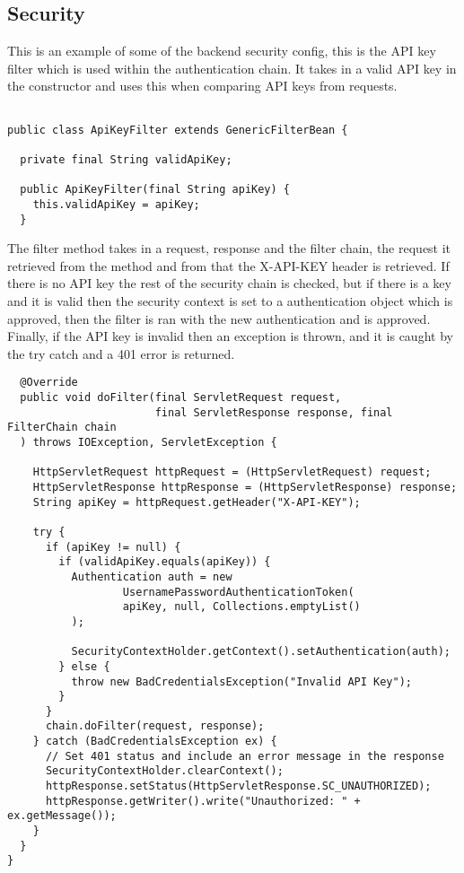 \documentclass[]{project_report}
\begin{document}
\subsection{Security}
This is an example of some of the backend security config, this is the API key filter which is used within the authentication chain. It takes in a valid API key in the constructor and uses this when comparing API keys from requests. 


\begin{verbatim}

public class ApiKeyFilter extends GenericFilterBean {

  private final String validApiKey;

  public ApiKeyFilter(final String apiKey) {
    this.validApiKey = apiKey;
  }

\end{verbatim}

The filter method takes in a request, response and the filter chain, the request it retrieved from the method and from that the X-API-KEY header is retrieved. If there is no API key the rest of the security chain is checked, but if there is a key and it is valid then the security context is set to a authentication object which is approved, then the filter is ran with the new authentication and is approved. Finally, if the API key is invalid then an exception is thrown, and it is caught by the try catch and a 401 error is returned. 

\begin{verbatim}
  @Override
  public void doFilter(final ServletRequest request,
                       final ServletResponse response, final FilterChain chain
  ) throws IOException, ServletException {

    HttpServletRequest httpRequest = (HttpServletRequest) request;
    HttpServletResponse httpResponse = (HttpServletResponse) response;
    String apiKey = httpRequest.getHeader("X-API-KEY");

    try {
      if (apiKey != null) {
        if (validApiKey.equals(apiKey)) {
          Authentication auth = new
                  UsernamePasswordAuthenticationToken(
                  apiKey, null, Collections.emptyList()
          );

          SecurityContextHolder.getContext().setAuthentication(auth);
        } else {
          throw new BadCredentialsException("Invalid API Key");
        }
      }
      chain.doFilter(request, response);
    } catch (BadCredentialsException ex) {
      // Set 401 status and include an error message in the response
      SecurityContextHolder.clearContext();
      httpResponse.setStatus(HttpServletResponse.SC_UNAUTHORIZED);
      httpResponse.getWriter().write("Unauthorized: " + ex.getMessage());
    }
  }
}

\end{verbatim}
\end{document}
